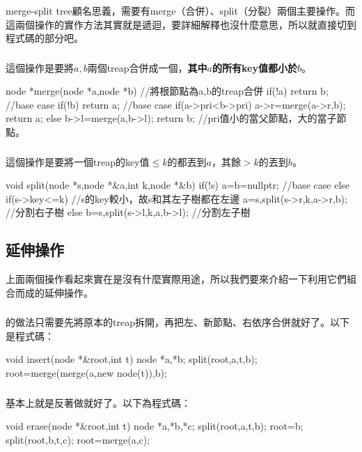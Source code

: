 merge-split tree顧名思義，需要有merge（合併）、split（分裂）兩個主要操作。而這兩個操作的實作方法其實就是遞迴，要詳細解釋也沒什麼意思，所以就直接切到程式碼的部分吧。
\subsubsection{}
這個操作是要將$a,b$兩個treap合併成一個，\textbf{其中$a$的所有key值都小於$b$}。
\begin{C++}
node *merge(node *a,node *b){ //將根節點為a,b的treap合併
	if(!a) return b; //base case
	if(!b) return a; //base case
	if(a->pri<b->pri){
		a->r=merge(a->r,b);
		return a;
	}else{
		b->l=merge(a,b->l);
		return b;
	} //pri值小的當父節點，大的當子節點。
}
\end{C++}
\subsubsection{}
這個操作是要將一個treap的key值$\leq k$的都丟到$a$，其餘$>k$的丟到$b$。
\begin{C++}
void split(node *s,node *&a,int k,node *&b){
	if(!s) a=b=nullptr; //base case
	else if(s->key<=k) //s的key較小，故s和其左子樹都在左邊
		a=s,split(s->r,k,a->r,b); //分割右子樹
	else 
		b=s,split(s->l,k,a,b->l); //分割左子樹
}
\end{C++}
\subsection{延伸操作}
上面兩個操作看起來實在是沒有什麼實際用途，所以我們要來介紹一下利用它們組合而成的延伸操作。
\subsubsection{}
的做法只需要先將原本的treap拆開，再把左、新節點、右依序合併就好了。以下是程式碼：
\begin{C++}
void insert(node *&root,int t){
	node *a,*b;
	split(root,a,t,b);
	root=merge(merge(a,new node(t)),b);
}
\end{C++}
\subsubsection{}
基本上就是反著做就好了。以下為程式碼：
\begin{C++}
void erase(node *&root,int t){
	node *a,*b,*c;
	split(root,a,t,b);
	root=b;
	split(root,b,t,c);
	root=merge(a,c);
}
\end{C++}
